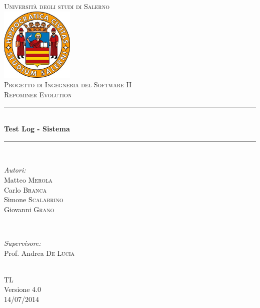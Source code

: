 \documentclass[a4paper, 12pt, italian]{report}
\begin{document}
\begin{titlepage}
\newcommand{\HRule}{\rule{\linewidth}{0.5mm}} 
\center 
\textsc{\LARGE Università degli studi di Salerno}\\[1cm] 
\includegraphics[width=3.5cm]{img/logo.jpg} \\[1cm]
\textsc{\large Progetto di Ingegneria del Software II}\\[0.5cm]
\textsc{\Large Repominer Evolution}\\[0.5cm] 
 \HRule \\[0.4cm]
{ \large \bfseries Test Log - Sistema}\\[0.4cm] 
\HRule \\[1.5cm]

\begin{minipage}{0.4\textwidth}
\begin{flushleft} \large
\emph{Autori:}\\
Matteo \textsc{Merola}\\
Carlo \textsc{Branca}\\
Simone \textsc{Scalabrino}\\
Giovanni \textsc{Grano}\\
\end{flushleft}
\end{minipage}
~
\begin{minipage}{0.4\textwidth}
\begin{flushright} \large
\emph{Supervisore:} \\
Prof. Andrea \textsc{De Lucia}
\end{flushright}
\end{minipage}\\[2.5cm]

{\Large TL}\\
Versione 4.0\\[1cm]

{\large 14/07/2014} %

\vfill

\end{titlepage}		
    
	\setcounter{tocdepth}{1}	
	\tableofcontents
	
	
	
	
	
\end{document}
